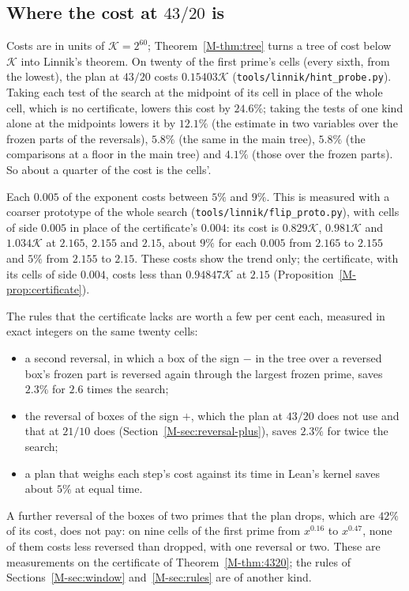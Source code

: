 \documentclass[11pt]{article}
\newcommand{\file}[1]{\nolinkurl{#1}}
\numberwithin{equation}{section}
\begin{document}
\subsection*{Where the cost at $43/20$ is}

Costs are in units of $\mathcal K = 2^{60}$; Theorem~\ref{M-thm:tree} turns a tree of cost below $\mathcal K$ into
Linnik's theorem. On twenty of the first prime's cells (every sixth, from the lowest), the plan at $43/20$ costs
$0.15403\mathcal K$ (\file{tools/linnik/hint\_probe.py}). Taking each test of the search at the midpoint of its cell
in place of the whole cell, which is no certificate, lowers this cost by $24.6\%$; taking the tests of one kind alone
at the midpoints lowers it by $12.1\%$ (the estimate in two variables over the frozen parts of the reversals), $5.8\%$
(the same in the main tree), $5.8\%$ (the comparisons at a floor in the main tree) and $4.1\%$ (those over the frozen
parts). So about a quarter of the cost is the cells'.

Each $0.005$ of the exponent costs between $5\%$ and $9\%$. This is measured with a coarser prototype of the whole
search (\file{tools/linnik/flip\_proto.py}), with cells of side $0.005$ in place of the certificate's $0.004$: its cost
is $0.829\mathcal K$, $0.981\mathcal K$ and $1.034\mathcal K$ at $2.165$, $2.155$ and $2.15$, about $9\%$ for each
$0.005$ from $2.165$ to $2.155$ and $5\%$ from $2.155$ to $2.15$. These costs show the trend only; the certificate,
with its cells of side $0.004$, costs less than $0.94847\mathcal K$ at $2.15$ (Proposition~\ref{M-prop:certificate}).

The rules that the certificate lacks are worth a few per cent each, measured in exact integers on the same twenty
cells:
\begin{itemize}
\item a second reversal, in which a box of the sign $-$ in the tree over a reversed box's frozen part is reversed
  again through the largest frozen prime, saves $2.3\%$ for $2.6$ times the search;
\item the reversal of boxes of the sign $+$, which the plan at $43/20$ does not use and that at $21/10$ does
  (Section~\ref{M-sec:reversal-plus}), saves $2.3\%$ for twice the search;
\item a plan that weighs each step's cost against its time in Lean's kernel saves about $5\%$ at equal time.
\end{itemize}
A further reversal of the boxes of two primes that the plan drops, which are $42\%$ of its cost, does not pay: on nine
cells of the first prime from $x^{0.16}$ to $x^{0.47}$, none of them costs less reversed than dropped, with one
reversal or two. These are measurements on the certificate of
Theorem~\ref{M-thm:4320}; the rules of Sections~\ref{M-sec:window} and~\ref{M-sec:rules} are of another kind.
\end{document}
